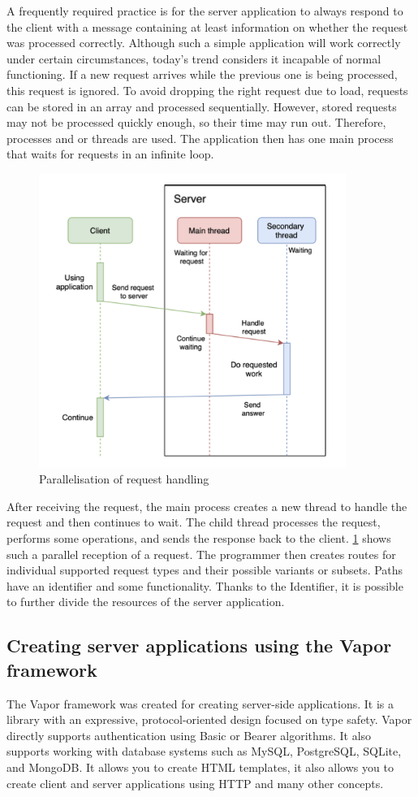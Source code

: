 \documentclass[
  biblatex,
  language=english,
  figures=false,
  sourcecodes,
  glossaries,
  index
]{kidiplom}
\begin{document}
A frequently required practice is for the server application to always respond to the client with a message containing at least information on whether the request was processed correctly.
Although such a simple application will work correctly under certain circumstances, today's trend considers it incapable of normal functioning. If a new request arrives while the previous one is being processed, this request is ignored. To avoid dropping the right request due to load, requests can be stored in an array and processed sequentially. However, stored requests may not be processed quickly enough, so their time may run out. Therefore, processes and or threads are used. The application then has one main process that waits for requests in an infinite loop.

\begin{figure}[h]
\centering
\includegraphics[width=10cm]{image1}
\caption{Parallelisation of request handling}
\label{fig:image1}
\end{figure}

After receiving the request, the main process creates a new thread to handle the request and then continues to wait. The child thread processes the request, performs some operations, and sends the response back to the client. \ref{fig:image1} shows such a parallel reception of a request. The programmer then creates routes for individual supported request types and their possible variants or subsets. Paths have an identifier and some functionality. Thanks to the Identifier, it is possible to further divide the resources of the server application.

\subsection{Creating server applications using the Vapor framework}
The Vapor framework was created for creating server-side applications. It is a library with an expressive, protocol-oriented design focused on type safety. Vapor directly supports authentication using Basic or Bearer algorithms. It also supports working with database systems such as MySQL, PostgreSQL, SQLite, and MongoDB. It allows you to create HTML templates, it also allows you to create client and server applications using HTTP and many other concepts.
\end{document}
